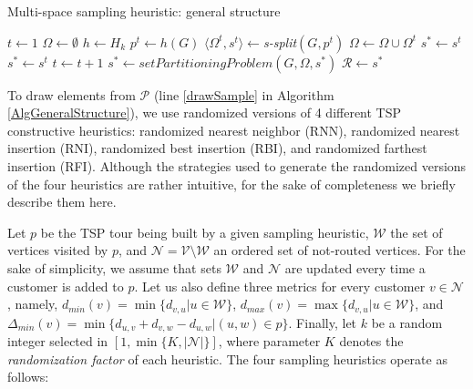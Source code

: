 \begin{algorithm}
\scriptsize
\caption{Multi-space sampling heuristic: general structure}\label{AlgGeneralStructure}
\begin{algorithmic}[1]
    \State $t\leftarrow1$
    \State $\Omega\leftarrow\emptyset$
    \label{samplingStart}
            \State $h\leftarrow H_{k}$
            \State $p^{t}\leftarrow h(G)$ \label{drawSample}
            \State $\langle\Omega^{t},s^{t}\rangle\leftarrow$\emph{s-split}$(G,p^{t})$ \label{split}
            \State $\Omega\leftarrow \Omega \cup \Omega^{t}$\label{updateOmega}
             \label{saveBestStart}
                \State $s^*\leftarrow s^{t}$
                \State $s^*\leftarrow s^{t}$
            \EndIf \label{saveBestEnd}
            \State $t\leftarrow t+1$
        \EndFor
    \EndWhile\label{samplingEnd}
    \State $s^*\leftarrow setPartitioningProblem(G,\Omega,s^*)$\label{mapping}
    \State \Return $\mathcal{R}\leftarrow s^*$
\EndFunction
\end{algorithmic}
\end{algorithm}

To draw elements from $\mathcal{P}$ (line \ref{drawSample} in Algorithm \ref{AlgGeneralStructure}), we use randomized versions of 4 different TSP constructive heuristics: randomized nearest neighbor (RNN), randomized nearest insertion (RNI), randomized best insertion (RBI), and randomized farthest insertion (RFI). Although the strategies used to generate the randomized versions of the four heuristics are rather intuitive, for the sake of completeness we briefly describe them here.

Let $p$ be the TSP tour being built by a given sampling heuristic, $\mathcal{W}$ the set of vertices visited by $p$, and $\mathcal{N}=\mathcal{V}\setminus \mathcal{W}$ an ordered set of not-routed vertices. For the sake of simplicity, we assume that sets $\mathcal{W}$ and $\mathcal{N}$ are updated every time a customer is added to $p$. Let us also define three metrics for every customer $v\in\mathcal{N}$, namely, $d_{min}(v)=\min\{d_{v,u}|u\in \mathcal{W}\}$, $d_{max}(v)=\max\{d_{v,u}|u\in \mathcal{W}\}$, and $\Delta_{min}(v)=\min\{d_{u,v}+d_{v,w}-d_{u,w}|(u,w)\in p\}$. Finally, let $k$ be a random integer selected in $[1,\min\{K,|\mathcal{N}|\}]$, where parameter $K$ denotes the \emph{randomization factor} of each heuristic. The four sampling heuristics operate as follows:

